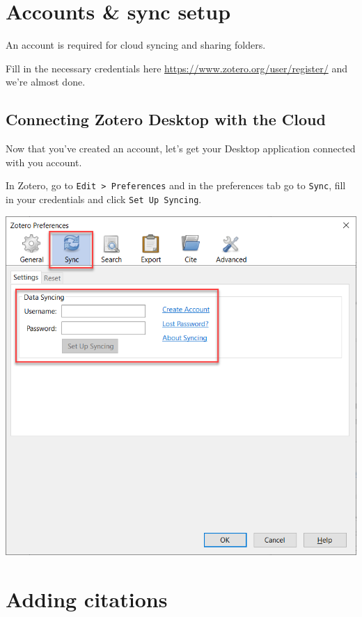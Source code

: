 \documentclass[
]{book}
\begin{document}
\hypertarget{accounts-sync-setup}{%
\section{Accounts \& sync setup}\label{accounts-sync-setup}}

An account is required for cloud syncing and sharing folders.

Fill in the necessary credentials here \url{https://www.zotero.org/user/register/} and we're almost done.

\hypertarget{connecting-zotero-desktop-with-the-cloud}{%
\subsection*{Connecting Zotero Desktop with the Cloud}\label{connecting-zotero-desktop-with-the-cloud}}

Now that you've created an account, let's get your Desktop application connected with you account.

In Zotero, go to \texttt{Edit\ \textgreater{}\ Preferences} and in the preferences tab go to \texttt{Sync}, fill in your credentials and click \texttt{Set\ Up\ Syncing}.

\includegraphics{images/Z_Sync.png}

\hypertarget{adding-citations}{%
\section{Adding citations}\label{adding-citations}}
\end{document}
